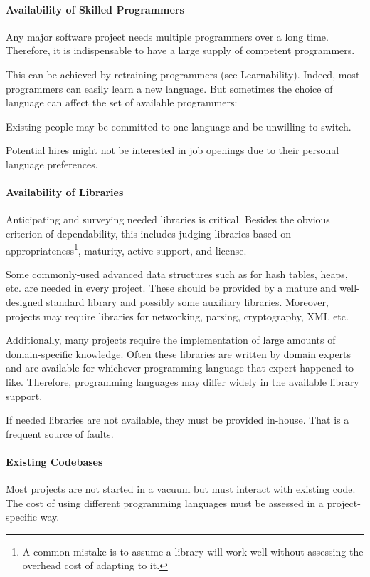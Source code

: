 \paragraph{Availability of Skilled Programmers}
Any major software project needs multiple programmers over a long time.
Therefore, it is indispensable to have a large supply of competent programmers.

This can be achieved by retraining programmers (see Learnability).
Indeed, most programmers can easily learn a new language.
But sometimes the choice of language can affect the set of available programmers:
\begin{compactitem}
 \item Existing people may be committed to one language and be unwilling to switch.
 \item Potential hires might not be interested in job openings due to their personal language preferences.
\end{compactitem}

\paragraph{Availability of Libraries}
Anticipating and surveying needed libraries is critical.
Besides the obvious criterion of dependability, this includes judging libraries based on appropriateness\footnote{A common mistake is to assume a library will work well without assessing the overhead cost of adapting to it.}, maturity, active support, and license.

Some commonly-used advanced data structures such as for hash tables, heaps, etc. are needed in every project.
These should be provided by a mature and well-designed standard library and possibly some auxiliary libraries.
Moreover, projects may require libraries for networking, parsing, cryptography, XML etc.

Additionally, many projects require the implementation of large amounts of domain-specific knowledge.
Often these libraries are written by domain experts and are available for whichever programming language that expert happened to like.
Therefore, programming languages may differ widely in the available library support.

If needed libraries are not available, they must be provided in-house.
That is a frequent source of faults.

\paragraph{Existing Codebases}
Most projects are not started in a vacuum but must interact with existing code.
The cost of using different programming languages must be assessed in a project-specific way.

